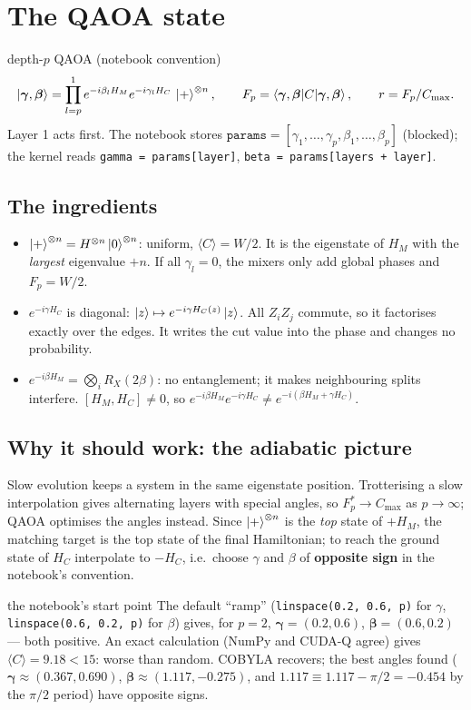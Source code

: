 \documentclass[11pt,a4paper,openany]{book}
\newcounter{wex}[chapter]
\newcommand{\bg}{\boldsymbol\gamma}
\newcommand{\bb}{\boldsymbol\beta}
\begin{document}
\section{The QAOA state}
\begin{defn}{depth-$p$ QAOA (notebook convention)}
\[ \ket{\bg,\bb} = \prod_{l=p}^{1} e^{-i\beta_lH_M}e^{-i\gamma_lH_C}\,\ket+^{\otimes n}, \qquad F_p = \braket{\bg,\bb|C|\bg,\bb},\qquad r = F_p/C_{\max}. \]
Layer 1 acts first. The notebook stores $\texttt{params} = [\gamma_1, \dots, \gamma_p, \beta_1, \dots, \beta_p]$ (blocked); the kernel reads
\texttt{gamma = params[layer]}, \texttt{beta = params[layers + layer]}.
\end{defn}
\subsection{The ingredients}
\begin{itemize}
\item $\ket+^{\otimes n} = H^{\otimes n}\ket0^{\otimes n}$: uniform, $\langle C\rangle = W/2$. It is the eigenstate of $H_M$ with the \emph{largest}
eigenvalue $+n$. If all $\gamma_l = 0$, the mixers only add global phases and $F_p = W/2$.
\item $e^{-i\gamma H_C}$ is diagonal: $\ket z \mapsto e^{-i\gamma H_C(z)}\ket z$. All $Z_iZ_j$ commute, so it factorises exactly over the edges.
It writes the cut value into the phase and changes no probability.
\item $e^{-i\beta H_M} = \bigotimes_i R_X(2\beta)$: no entanglement; it makes neighbouring splits interfere. $[H_M, H_C] \neq 0$, so
$e^{-i\beta H_M}e^{-i\gamma H_C} \neq e^{-i(\beta H_M + \gamma H_C)}$.
\end{itemize}
\subsection{Why it should work: the adiabatic picture}
Slow evolution keeps a system in the same eigenstate position. Trotterising a slow interpolation gives alternating layers with
special angles, so $F_p^* \to C_{\max}$ as $p\to\infty$; QAOA optimises the angles instead. Since $\ket+^{\otimes n}$ is the \emph{top} state of
$+H_M$, the matching target is the top state of the final Hamiltonian; to reach the ground state of $H_C$ interpolate to $-H_C$, i.e.\
choose $\gamma$ and $\beta$ of \textbf{opposite sign} in the notebook's convention.

\begin{wexample}{the notebook's start point}
The default ``ramp'' (\texttt{linspace(0.2, 0.6, p)} for $\gamma$, \texttt{linspace(0.6, 0.2, p)} for $\beta$) gives, for $p = 2$,
$\bg = (0.2, 0.6)$, $\bb = (0.6, 0.2)$ --- both positive. An exact calculation (NumPy and CUDA-Q agree) gives $\langle C\rangle = 9.18 < 15$:
worse than random. COBYLA recovers; the best angles found ($\bg \approx (0.367, 0.690)$, $\bb \approx (1.117, -0.275)$, and
$1.117 \equiv 1.117 - \pi/2 = -0.454$ by the $\pi/2$ period) have opposite signs.
\end{wexample}
\end{document}
